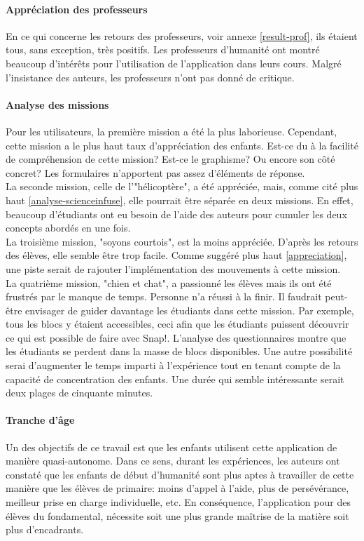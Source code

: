 \paragraph{Appréciation des professeurs}
En ce qui concerne les retours des professeurs, voir annexe \ref{result-prof}, ils étaient tous, sans exception, très positifs. Les professeurs d'humanité ont montré beaucoup d'intérêts pour l'utilisation de l'application dans leurs cours. Malgré l'insistance des auteurs, les professeurs n'ont pas donné de critique.

\paragraph{Analyse des missions}
Pour les utilisateurs, la première mission a été la plus laborieuse. Cependant, cette mission a le plus haut taux d'appréciation des enfants. Est-ce du à la facilité de compréhension de cette mission? Est-ce le graphisme? Ou encore son côté concret? Les formulaires n'apportent pas assez d'éléments de réponse.\\

La seconde mission, celle de l'"hélicoptère", a été appréciée, mais, comme cité plus haut \ref{analyse-scienceinfuse}, elle pourrait être séparée en deux missions. En effet, beaucoup d'étudiants ont eu besoin de l'aide des auteurs pour cumuler les deux concepts abordés en une fois.\\

La troisième mission, "soyons courtois", est la moins appréciée. D'après les retours des élèves, elle semble être trop facile. Comme suggéré plus haut \ref{appreciation}, une piste serait de rajouter l'implémentation des mouvements à cette mission.\\

La quatrième mission, "chien et chat", a passionné les élèves mais ils ont été frustrés par le manque de temps. Personne n'a réussi à la finir. Il faudrait peut-être envisager de guider davantage les étudiants dans cette mission. Par exemple, tous les blocs y étaient accessibles, ceci afin que les étudiants puissent découvrir ce qui est possible de faire avec Snap!. L'analyse des questionnaires montre que les étudiants se perdent dans la masse de blocs disponibles.
Une autre possibilité serai d'augmenter le temps imparti à l'expérience tout en tenant compte de la capacité de concentration des enfants. Une durée qui semble intéressante serait deux plages de cinquante minutes.

\paragraph{Tranche d'âge}
\label{trancheage}
Un des objectifs de ce travail est que les enfants utilisent cette application de manière quasi-autonome. Dans ce sens, durant les expériences, les auteurs ont constaté que les enfants de début d'humanité sont plus aptes à travailler de cette manière que les élèves de primaire: moins d'appel à l'aide, plus de persévérance, meilleur prise en charge individuelle, etc.
En conséquence, l'application pour des élèves du fondamental, nécessite soit une plus grande maîtrise de la matière soit plus d'encadrants.






